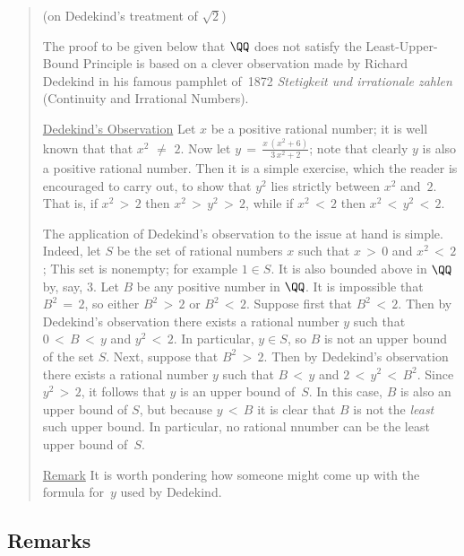 \begin{quotation}
{\footnotesize \underline{\Note} (on Dedekind's treatment of $\sqrt{2}$)

        The proof to be given below that ${\QQ}$ does not satisfy the Least-Upper-Bound Principle is based on a clever observation
    made by Richard Dedekind in his famous pamphlet of~1872 {\em Stetigkeit und irrationale zahlen} (Continuity and Irrational Numbers).


\VA

        \h \underline{Dedekind's Observation}
    Let $x$ be a positive rational number; it is well known that that $x^{2} \,\,{\neq}\,\, 2$.
    Now let ${\displaystyle y \,=\, \frac{x\,(x^{2} + 6)}{3\,x^{2} + 2}}$; note that clearly $y$ is also a positive rational number.
    Then it is a simple exercise, which the reader is encouraged to carry out, to show that $y^{2}$ lies strictly between $x^{2}$ and~$2$.
    That is, if $x^{2}\,>\,2$ then $x^{2}\,>\,y^{2}\,>\,2$, while if $x^{2}\,<\,2$ then $x^{2}\,<\,y^{2}\,<\,2$.

\VA

        The application of Dedekind's observation to the issue at hand is simple.
    Indeed, let $S$ be the set of rational numbers $x$ such that $x\,>\,0$ and $x^{2}\,<\,2$;
    This set is nonempty; for example $1{\in}S$. It is also bounded above in ${\QQ}$ by, say, $3$.
    Let $B$ be any positive number in ${\QQ}$. It is impossible that $B^{2} \,=\, 2$, so either $B^{2}\,>\,2$ or $B^{2}\,<\,2$.
    Suppose first that $B^{2}\,<\,2$. Then by Dedekind's observation there exists a rational number $y$ such that $0\,<\,B\,<\,y$ and $y^{2}\,<\,2$.
    In particular, $y{\in}S$, so $B$ is not an upper bound of the set $S$.
    Next, suppose that $B^{2}\,>\,2$. Then by Dedekind's observation there exists
    a rational number $y$ such that $B\,<\,y$ and $2\,<\,y^{2}\,<\,B^{2}$.     Since $y^{2}\,>\,2$, it follows that $y$ is an upper bound of~$S$.
    In this case, $B$ is also an upper bound of $S$, but because $y\,<\,B$ it is clear that $B$ is not the {\em least} such upper bound.
    In particular, no rational nnumber can be the least upper bound of~$S$.

        \underline{Remark} It is worth pondering how someone might come up with the formula for~$y$ used by Dedekind.

}%
\end{quotation}       

            \subsection{\small{\bf Remarks}}
            \label{RemrkB30.10B}

